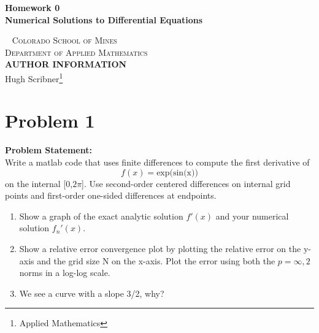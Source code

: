\documentclass[12pt]{article}
\begin{document}
\newpage
\newpage
\newtheorem{theorem}{Theorem}

\begin{titlepage}

    \begin{center}
        \vspace*{2.5in}
            \huge
            \textbf{{Homework 0}}\\
            \large
            \textbf{{Numerical Solutions to Differential Equations}}\\
    \end{center}
    ~\vfill
    \noindent \textsc{Colorado School of Mines}\\
    \textsc{Department of Applied Mathematics}\\
    
    \vspace{1cm}
    \noindent \textsc{\textbf{AUTHOR INFORMATION}}\\
    \noindent Hugh Scribner\footnote{Applied Mathematics}\\ 
    \vspace{1mm}
    
\end{titlepage}

\newpage

\tableofcontents

\newpage
\section{Problem 1}
 \begin{tcolorbox}
        \textbf{Problem Statement:}\\
        Write a matlab code that uses finite differences to compute
        the first derivative of
        \[f(x) = \text{exp(sin(x))}\]
        on the internal [0,$2\pi$]. Use second-order centered differences on internal grid points and first-order one-sided differences at endpoints.
    \begin{enumerate}
        \item Show a graph of the exact analytic solution $f'(x)$ and your numerical solution $f_n'(x)$.
        \item Show a relative error convergence plot by plotting the relative error on the y-axis and the
        grid size N on the x-axis. Plot the error using both the $p = \infty, 2$ norms in a log-log scale.
        \item We see a curve with a slope 3/2, why?
    \end{enumerate}
        
    \end{tcolorbox}
    
\end{document}

